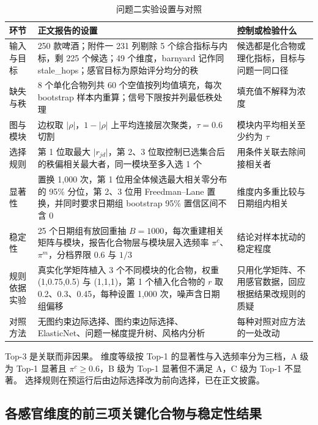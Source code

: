 \begin{table}[htbp]
\centering\small
\caption{问题二实验设置与对照}
\label{tab:q2-setup}
\begin{tabular}{p{3.0cm}p{5.4cm}p{4.2cm}}
\toprule
环节 & 正文报告的设置 & 控制或检验什么 \\
\midrule
输入与目标 & 250 款啤酒；附件一 231 列剔除 5 个综合指标与内标，剩 225 个候选；49 个维度，barnyard 记作同 stale\_hops；感官目标为原始评分均分的秩 & 候选都是化合物或理化指标，目标与问题一同口径 \\
\addlinespace
缺失与秩 & 8 个单化合物列共 60 个空值按列均值填充，每次 bootstrap 样本内重算；信号下限按并列最低秩处理 & 填充值不解释为浓度 \\
\addlinespace
图与模块 & 边权取 $\lvert\rho\rvert$，$1-\lvert\rho\rvert$ 上平均连接层次聚类，$\tau=0.6$ 切割 & 模块内平均相关至少约为 $\tau$ \\
\addlinespace
选择规则 & 第 1 位取最大 $\lvert r_{jd}\rvert$，第 2、3 位取控制已选集合后的秩偏相关最大者，同一模块至多入选 1 个 & 用条件关联去除间接相关者 \\
\addlinespace
显著性 & 置换 1,000 次，第 1 位用全体候选最大相关零分布的 95\% 分位，第 2、3 位用 Freedman--Lane 置换，并同时要求日期组 bootstrap 95\% 置信区间不含 0 & 维度内多重比较与日期组内相关 \\
\addlinespace
稳定性 & 25 个日期组有放回重抽 $B=1000$，每次重建相关矩阵与模块，报告化合物层与模块层入选频率 $\pi^c$、$\pi^m$，分档界限 0.6 与 $1/3$ & 结论对样本扰动的稳定程度 \\
\addlinespace
规则依据实验 & 真实化学矩阵植入 3 个不同模块的化合物，权重 (1,0.75,0.5) 与 (1,1,1)，第 1 个植入化合物的 $r$ 取 0.2、0.3、0.45，每种设置 1,000 次，噪声含日期组偏移 & 只用化学矩阵、不用感官数据，回应根据结果改规则的质疑 \\
\addlinespace
对照方法 & 无图约束边际选择、图约束边际选择、ElasticNet、问题一梯度提升树、风格内分析 & 每种对照对应方法的一处改动 \\
\bottomrule
\end{tabular}
\end{table}

Top-3 是关联而非因果。
维度等级按 Top-1 的显著性与入选频率分为三档，A 级为 Top-1 显著且 $\pi^c\ge0.6$，B 级为 Top-1 显著但不满足 A，C 级为 Top-1 不显著。
选择规则在预运行后由边际选择改为前向选择，已在正文披露。

\subsection{各感官维度的前三项关键化合物与稳定性结果}

